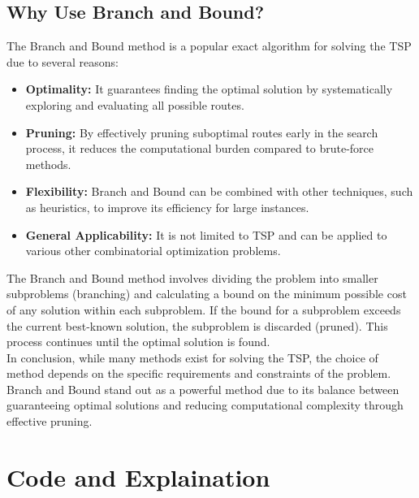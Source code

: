 \documentclass[a4paper]{article}
\begin{document}
\subsection{Why Use Branch and Bound?}
The Branch and Bound method is a popular exact algorithm for solving the TSP due to several reasons:
\begin{itemize}
    \item \textbf{Optimality:} It guarantees finding the optimal solution by systematically exploring and evaluating all possible routes.
    \item \textbf{Pruning:} By effectively pruning suboptimal routes early in the search process, it reduces the computational burden compared to brute-force methods.
    \item \textbf{Flexibility:} Branch and Bound can be combined with other techniques, such as heuristics, to improve its efficiency for large instances.
    \item \textbf{General Applicability:} It is not limited to TSP and can be applied to various other combinatorial optimization problems.
\end{itemize}

The Branch and Bound method involves dividing the problem into smaller subproblems (branching) and calculating a bound on the minimum possible cost of any solution within each subproblem. If the bound for a subproblem exceeds the current best-known solution, the subproblem is discarded (pruned). This process continues until the optimal solution is found.\\

In conclusion, while many methods exist for solving the TSP, the choice of method depends on the specific requirements and constraints of the problem. Branch and Bound stand out as a powerful method due to its balance between guaranteeing optimal solutions and reducing computational complexity through effective pruning.


\section{Code and Explaination}
\end{document}
